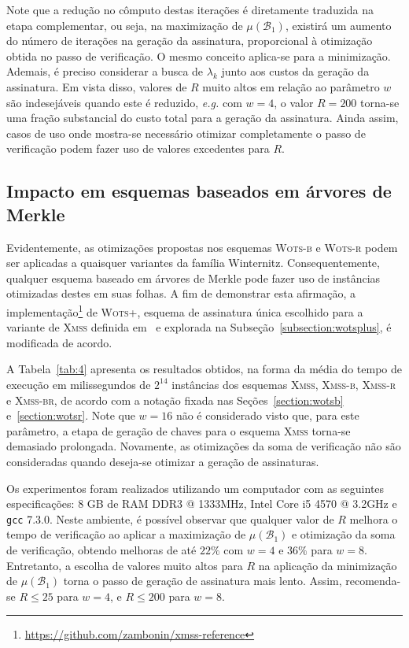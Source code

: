 \documentclass{ufsctex/ufsctex}
\newcommand{\wotsplus}{\textsc{Wots+}}
\newcommand{\wotsb}{\textsc{Wots-b}}
\newcommand{\wotsr}{\textsc{Wots-r}}
\newcommand{\xmss}{\textsc{Xmss}}
\newcommand{\xmssb}{\textsc{Xmss-b}}
\newcommand{\xmssr}{\textsc{Xmss-r}}
\newcommand{\xmssbr}{\textsc{Xmss-br}}
\begin{document}
Note que a redução no cômputo destas iterações é diretamente traduzida na etapa
complementar, ou seja, na maximização de $\mu(\mathcal{B}_1)$, existirá um
aumento do número de iterações na geração da assinatura, proporcional à
otimização obtida no passo de verificação. O mesmo conceito aplica-se para a
minimização. Ademais, é preciso considerar a busca de $\lambda_k$ junto aos
custos da geração da assinatura. Em vista disso, valores de $R$ muito altos em
relação ao parâmetro $w$ são indesejáveis quando este é reduzido, \emph{e.g.}
com $w = 4$, o valor $R = 200$ torna-se uma fração substancial do custo total
para a geração da assinatura. Ainda assim, casos de uso onde mostra-se
necessário otimizar completamente o passo de verificação podem fazer uso de
valores excedentes para $R$.

\subsection{Impacto em esquemas baseados
  em árvores de Merkle}\label{subsection:impact}

Evidentemente, as otimizações propostas nos esquemas \wotsb{} e \wotsr{} podem
ser aplicadas a quaisquer variantes da família Winternitz. Consequentemente,
qualquer esquema baseado em árvores de Merkle pode fazer uso de instâncias
otimizadas destes em suas folhas. A fim de demonstrar esta afirmação, a
implementação\footnote{\url{https://github.com/zambonin/xmss-reference}} de
\wotsplus{}, esquema de assinatura única escolhido para a variante de \xmss{}
definida em~\cite{irtf-cfrg-xmss-hash-based-signatures-12} e explorada na
Subseção~\ref{subsection:wotsplus}, é modificada de acordo.

A Tabela~\ref{tab:4} apresenta os resultados obtidos, na forma da média do
tempo de execução em milissegundos de $2^{14}$ instâncias dos esquemas \xmss{},
\xmssb{}, \xmssr{} e \xmssbr{}, de acordo com a notação fixada nas
Seções~\ref{section:wotsb} e~\ref{section:wotsr}. Note que $w = 16$ não é
considerado visto que, para este parâmetro, a etapa de geração de chaves para o
esquema \xmss{} torna-se demasiado prolongada. Novamente, as otimizações da
soma de verificação não são consideradas quando deseja-se otimizar a geração de
assinaturas.

Os experimentos foram realizados utilizando um computador com as seguintes
especificações: 8 GB de RAM DDR3 @ 1333MHz, Intel Core i5 4570 @ 3.2GHz e
\texttt{gcc} 7.3.0. Neste ambiente, é possível observar que qualquer valor de
$R$ melhora o tempo de verificação ao aplicar a maximização de
$\mu(\mathcal{B}_1)$ e otimização da soma de verificação, obtendo melhoras de
até $22\%$ com $w = 4$ e $36\%$ para $w = 8$. Entretanto, a escolha de valores
muito altos para $R$ na aplicação da minimização de $\mu(\mathcal{B}_1)$ torna
o passo de geração de assinatura mais lento. Assim, recomenda-se $R \leq 25$
para $w = 4$, e $R \leq 200$ para $w = 8$.
\end{document}
